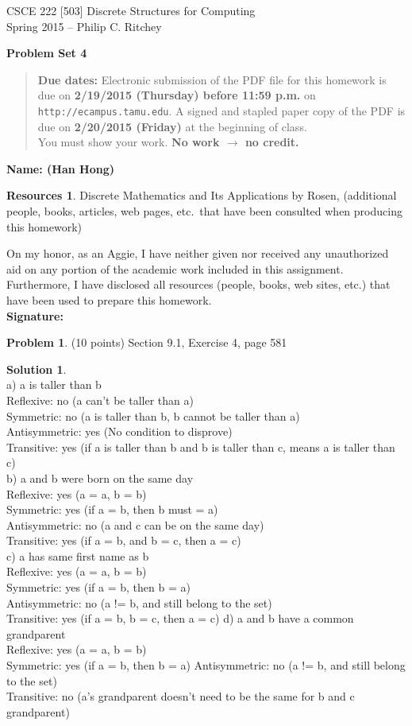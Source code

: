 \documentclass{article}
\theoremstyle{definition}
\newtheorem{problem}{Problem}
\newtheorem*{solution}{Solution}
\newtheorem*{resources}{Resources}
\newcommand{\name}[1]{\noindent\textbf{Name: #1}}
\newcommand{\honor}{\noindent On my honor, as an Aggie, I have neither given nor received any unauthorized aid on any portion of the academic work included in this assignment. Furthermore, I have disclosed all resources (people, books, web sites, etc.) that have been used to prepare this homework. 
\\[2ex]
\textbf{Signature:} \underline{\hspace*{7cm}} }
\newcommand{\problemset}[1]{\begin{center}\textbf{Problem Set #1}\end{center}}
\newcommand{\duedate}[2]{\begin{quote}\textbf{Due dates:} Electronic
    submission of the PDF file for this homework is due on
    \textbf{#1} on \texttt{http://ecampus.tamu.edu}.  A signed and stapled paper copy of the PDF is due on
    \textbf{#2} at the beginning of class.\\You must show your work.  \textbf{No work $\to$ no credit.}\end{quote} }
\begin{document}
\begin{center}
{\large
CSCE 222 [503] Discrete Structures for Computing\\[.5ex]
Spring 2015 -- Philip C. Ritchey\\}
\end{center}

\problemset{4}

\duedate{2/19/2015 (Thursday) before 11:59 p.m.}{2/20/2015 (Friday)}

\name{ (Han Hong) }

\begin{resources} Discrete Mathematics and Its Applications by Rosen, (additional people, books, articles, web pages, etc.\ that
  have been consulted when producing this homework)
\end{resources}

\honor

\bigskip

\begin{problem} (10 points)
Section 9.1, Exercise 4, page 581
\end{problem}
\begin{solution}~\\
a) a is taller than b \\
\indent	Reflexive: no (a can't be taller than a) \\
\indent	Symmetric: no (a is taller than b, b cannot be taller than a) \\
\indent	Antisymmetric: yes (No condition to disprove) \\
\indent Transitive: yes (if a is taller than b and b is taller than c, means a is taller than c) \\
b) a and b were born on the same day \\
\indent Reflexive: yes (a = a, b = b) \\
\indent Symmetric: yes (if a = b, then b must = a) \\
\indent Antisymmetric: no (a and c can be on the same day) \\
\indent Transitive: yes (if a = b, and b = c, then a = c)\\
c) a has same first name as b\\
\indent Reflexive: yes (a = a, b = b)\\
\indent Symmetric: yes (if a = b, then b = a)\\
\indent Antisymmetric: no (a != b, and still belong to the set)\\
\indent Transitive: yes (if a = b, b = c, then a = c)
d) a and b have a common grandparent\\
\indent Reflexive: yes (a = a, b = b)\\
\indent Symmetric: yes (if a = b, then b = a)
\indent Antisymmetric: no (a != b, and still belong to the set)\\
\indent Transitive: no (a's grandparent doesn't need to be the same for b and c grandparent)\\

\end{solution}
\end{document}
